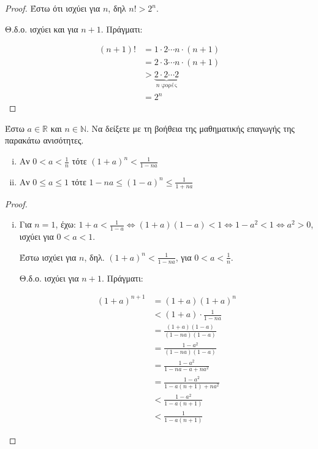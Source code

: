 \begin{multicols}{2}
\begin{enumerate}
\begin{proof}
            Έστω ότι ισχύει για $n$, δηλ $ n! >2^{n} $. 

            Θ.δ.ο. ισχύει και για $ n+1 $. Πράγματι:

            \begin{align*} (n+1)! &= 1 \cdot 2 \cdots n \cdot (n+1) \\
                &= 2 \cdot 3 \cdots n \cdot (n+1) \\ 
                & > \underbrace{2 \cdot 2 \cdots 2}_{n \; \text{φορές}} \\
                &= 2^{n} 
            \end{align*}
        \end{proof}


    \item \textcolor{Col1}{Έστω $ a \in \mathbb{R} $ και $ n \in \mathbb{N}$.
            Να δείξετε με τη βοήθεια της μαθηματικής επαγωγής της 
            παρακάτω ανισότητες.
        \begin{enumerate}[i)]
            \item Αν $ 0<a< \frac{1}{n} $ τότε $ (1+a)^{n} < \frac{1}{1-na} $
            \item Αν $ 0 \leq a \leq 1$  τότε $ 1-na \leq (1-a)^{n} \leq
                \frac{1}{1+na} $
    \end{enumerate}}

        \begin{proof}
        \item {}
            \begin{enumerate}[i)]
                \item Για $ n=1 $, έχω: $ 1+a < \frac{1}{1-a} 
                    \Leftrightarrow (1+a)(1-a) < 1 
                    \Leftrightarrow 1-a^{2} <1 \Leftrightarrow a^{2} > 0  $,
                    ισχύει για $ 0<a<1 $.

                    Έστω ισχύει για $ n $, δηλ. $ (1+a)^{n} < \frac{1}{1-na}
                    $, για $ 0 < a < \frac{1}{n} $.

                    Θ.δ.ο. ισχύει για $ n+1 $. Πράγματι:

                    \begin{align*}
                        (1+a)^{n+1} &= (1+a)(1+a)^{n} \\
                                    &< (1+a)\cdot \frac{1}{1-na} \\
                                    &= \frac{(1+a)(1-a)}{(1-na)(1-a)} \\
                                    &= \frac{1-a^{2}}{(1-na)(1-a)} \\ 
                                    &= \frac{1-a^{2}}{1-na-a+na^{2}} \\
                                    &= \frac{1-a^{2}}{1-a(n+1)+na^{2}} \\
                                    &< \frac{1-a^{2}}{1-a(n+1)} \\
                                    &< \frac{1}{1-a(n+1)} 
                    \end{align*}



\end{enumerate}
\end{proof}
\end{enumerate}
\end{multicols}

